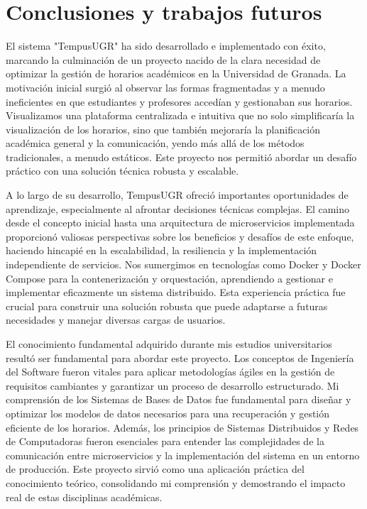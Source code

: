 \chapter{Conclusiones y trabajos futuros}\label{cap:conclusiones}

El sistema "TempusUGR" ha sido desarrollado e implementado con éxito, marcando la culminación de un proyecto nacido de la clara necesidad de optimizar la gestión de horarios académicos en la Universidad de Granada. La motivación inicial surgió al observar las formas fragmentadas y a menudo ineficientes en que estudiantes y profesores accedían y gestionaban sus horarios. Visualizamos una plataforma centralizada e intuitiva que no solo simplificaría la visualización de los horarios, sino que también mejoraría la planificación académica general y la comunicación, yendo más allá de los métodos tradicionales, a menudo estáticos. Este proyecto nos permitió abordar un desafío práctico con una solución técnica robusta y escalable.\newline

A lo largo de su desarrollo, TempusUGR ofreció importantes oportunidades de aprendizaje, especialmente al afrontar decisiones técnicas complejas. El camino desde el concepto inicial hasta una arquitectura de microservicios implementada proporcionó valiosas perspectivas sobre los beneficios y desafíos de este enfoque, haciendo hincapié en la escalabilidad, la resiliencia y la implementación independiente de servicios. Nos sumergimos en tecnologías como Docker y Docker Compose para la contenerización y orquestación, aprendiendo a gestionar e implementar eficazmente un sistema distribuido. Esta experiencia práctica fue crucial para construir una solución robusta que puede adaptarse a futuras necesidades y manejar diversas cargas de usuarios.\newline

El conocimiento fundamental adquirido durante mis estudios universitarios resultó ser fundamental para abordar este proyecto. Los conceptos de Ingeniería del Software fueron vitales para aplicar metodologías ágiles en la gestión de requisitos cambiantes y garantizar un proceso de desarrollo estructurado. Mi comprensión de los Sistemas de Bases de Datos fue fundamental para diseñar y optimizar los modelos de datos necesarios para una recuperación y gestión eficiente de los horarios. Además, los principios de Sistemas Distribuidos y Redes de Computadoras fueron esenciales para entender las complejidades de la comunicación entre microservicios y la implementación del sistema en un entorno de producción. Este proyecto sirvió como una aplicación práctica del conocimiento teórico, consolidando mi comprensión y demostrando el impacto real de estas disciplinas académicas.\newline

